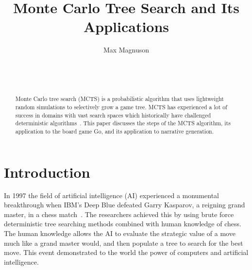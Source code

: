\documentclass{sig-alternate}
\begin{document}

\title{Monte Carlo Tree Search and Its Applications}


\author{
\alignauthor
Max Magnuson\\
	\\
	\\
	\\
}

\maketitle
\begin{abstract}
Monte Carlo tree search (MCTS) is a probabilistic algorithm that uses lightweight random simulations to selectively grow a game tree. MCTS has experienced a lot of success in domains with vast search spaces which historically have challenged deterministic algorithms~\cite{RAVEinGo}. This paper discusses the steps of the MCTS algorithm, its application to the board game Go, and its application to narrative generation. 
\end{abstract}


\section{Introduction} 
In 1997 the field of artificial intelligence (AI) experienced a monumental breakthrough when IBM's Deep Blue defeated Garry Kasparov, a reigning grand master, in a chess match~\cite{TheGrandChallenge}. The researchers achieved this by using brute force deterministic tree searching methods combined with human knowledge of chess. The human knowledge allows the AI to evaluate the strategic value of a move much like a grand master would, and then populate a tree to search for the best move. This event demonstrated to the world the power of computers and artificial intelligence. 
\end{document}
